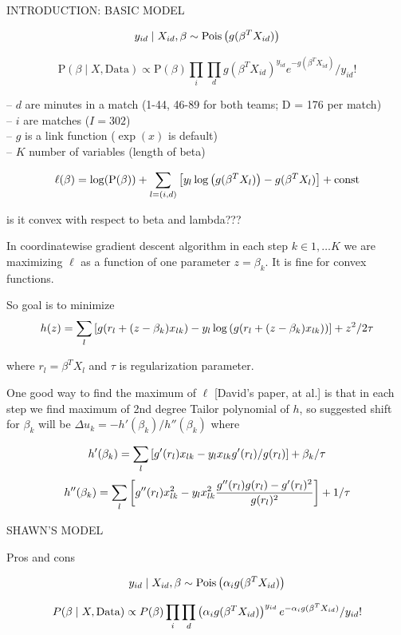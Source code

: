 \documentclass[12pt, letter]{article}
\begin{document}

\newpage

{\LARGE INTRODUCTION: BASIC MODEL}

$$y_{id}\mid X_{id}, \beta \sim \mathrm{Pois}\zag{g(\beta^T X_{id})}$$

$$\mathrm{P}(\beta\mid X, \mathrm{Data}) \propto \mathrm{P}(\beta) \prod_i \prod_d
    g(\beta^T X_{id})^{y_{id}} e^{-g(\beta^T X_{id})}/y_{id}!$$

   -- $d$ are minutes in a match (1-44, 46-89 for both teams; D = 176 per match)\\
   -- $i$ are matches ($I=302$)\\
   -- $g$ is a link function ($\exp(x)$ is default)\\
   -- $K$ number of variables (length of beta)

$$\ell(\beta) = \log(\mathrm{P(\beta)}) + \sum_{l=(i,d)} \zags{y_l\log\zag{g(\beta^T X_l)} - g(\beta^T X_l)} + \mathrm{const}$$

is it convex with respect to beta and lambda???

In coordinatewise gradient descent algorithm in each step $k \in 1,\dots K$ we are maximizing $\ell$ as a function of one parameter $z=\beta_k$. It is fine for convex functions.

So goal is to minimize
$$h(z) = \sum_l \zags{g(r_l + (z-\beta_k)x_{lk}) - y_l\log\zag{g(r_l + (z-\beta_k)x_{lk})}} + z^2/2\tau$$

where $r_l = \beta^T X_l$ and $\tau$ is regularization parameter.

One good way to find the maximum of $\ell$ [David's paper, at al.] is that in each step we find maximum of 2nd degree Tailor polynomial of $h$, so suggested shift for $\beta_k$ will be $\Delta u_k = -h'(\beta_k)/h''(\beta_k)$ where

$$h'(\beta_k) = \sum_l \zags{g'(r_l)x_{lk} - y_l x_{lk} g'(r_l)/g(r_l)} + \beta_k/\tau$$
$$h''(\beta_k) = \sum_l \zags{g''(r_l)x_{lk}^2 - y_l x_{lk}^2 \frac{g''(r_l)g(r_l) - g'(r_l)^2}{g(r_l)^2}} + 1/\tau$$


\newpage
{\LARGE SHAWN'S MODEL}

Pros and cons


$$y_{id}\mid X_{id}, \beta \sim \mathrm{Pois}\zag{\alpha_i g(\beta^T X_{id})}$$

$$P(\beta\mid X, \mathrm{Data}) \propto P(\beta) \prod_i \prod_d
    \zag{\alpha_i g(\beta^T X_{id})}^{y_{id}} e^{-\alpha_i g(\beta^T X_{id})}/y_{id}!$$
\end{document}

